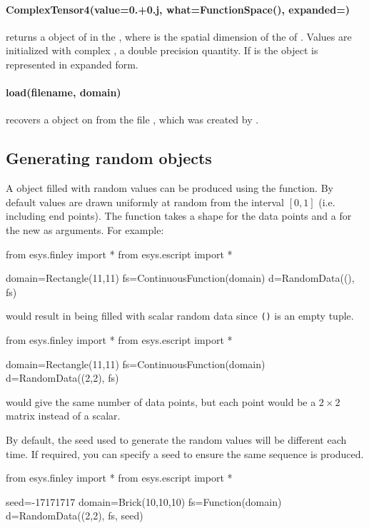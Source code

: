 \paragraph{ComplexTensor4(value=0.+0.j, what=FunctionSpace(), expanded=\False)}
returns a \Data object of \Shape {} in the \FunctionSpace {},
where  is the spatial dimension of the \Domain of .
Values are initialized with complex , a double precision quantity.
If  is \True the \Data object is represented in expanded form.


\paragraph{load(filename, domain)}
recovers a \Data object on \Domain {} from the file ,
which was created by .


\subsection{Generating random \Data objects}
A \Data object filled with random values can be produced using the
 function.
By default values are drawn uniformly at random from the interval $[0,1]$ (i.e.
including end points).
The function takes a shape for the data points and a \FunctionSpace for the new
\Data as arguments.
For example:
\begin{python}
from esys.finley import *
from esys.escript import *

domain=Rectangle(11,11)
fs=ContinuousFunction(domain)
d=RandomData((), fs)
\end{python}
would result in  being filled with scalar random data since \texttt{()}
is an empty tuple.

\begin{python}
from esys.finley import *
from esys.escript import *

domain=Rectangle(11,11)
fs=ContinuousFunction(domain)
d=RandomData((2,2), fs)
\end{python}
would give  the same number of data points, but each point would be a
$2\times 2$ matrix instead of a scalar.

By default, the seed used to generate the random values will be different each
time.
If required, you can specify a seed to ensure the same sequence is produced.
\begin{python}
from esys.finley import *
from esys.escript import *

seed=-17171717
domain=Brick(10,10,10)
fs=Function(domain)
d=RandomData((2,2), fs, seed)
\end{python}


